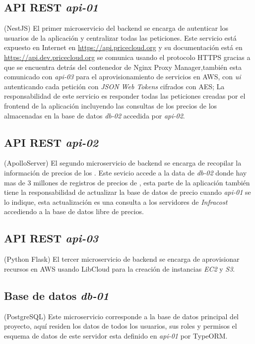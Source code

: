\subsection{\acrshort{API REST} \emph{api-01}} (NestJS)
El primer microservicio del backend se encarga de autenticar los usuarios de la aplicación y centralizar todas las peticiones. Este servicio está expuesto en Internet en \url{https://api.pricecloud.org} y su documentación está en \url{https://api.dev.pricecloud.org} se comunica usando el protocolo \acrshort{HTTPS} gracias a que se encuentra detrás del contenedor de \gls{Nginx Proxy Manager},también esta comunicado con \emph{api-03} para el aprovisionamiento de servicios
en \acrshort{AWS}, con \emph{ui} autenticando cada petición con \emph{JSON Web Tokens} cifrados con \acrfull{AES}; La responsabilidad de este servicio es responder todas las peticiones creadas por el frontend de la aplicación incluyendo las consultas de los precios de los  almacenadas en la base de datos \emph{db-02} accedida por \emph{api-02}.

\subsection{\acrshort{API REST} \emph{api-02}} (ApolloServer)
El segundo microservicio de backend se encarga de recopilar la información de precios de los . Este sevicio accede a la data de \emph{db-02} donde hay mas de 3 millones de registros de precios de , esta parte de la aplicación también tiene la responsabilidad de actualizar la base de datos de precio cuando \emph{api-01} se lo indique, esta actualización es una consulta a los servidores de \emph{Infracost} accediendo a la base de datos libre de precios.

\subsection{\acrshort{API REST} \emph{api-03}} (Python Flask)
El tercer microservicio de backend se encarga de aprovisionar recursos en \acrshort{AWS} usando \gls{LibCloud} para la creación de instancias \emph{EC2} y \emph{S3}.

\subsection{Base de datos \emph{db-01}} (PostgreSQL)
Este microservicio corresponde a la base de datos principal del proyecto, aquí residen los datos de todos los usuarios, sus roles y permisos el esquema de datos de este servidor esta definido en \emph{api-01} por \gls{TypeORM}.

